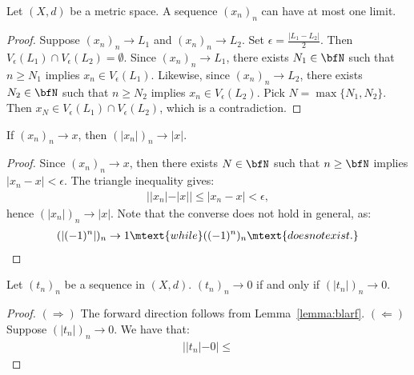     \begin{proposition}
        Let $(X,d)$ be a metric space. A sequence $(x_n)_n$ can have at most one limit.
    \end{proposition}
        \begin{proof}
            Suppose $(x_n)_n \rightarrow L_1$ and $(x_n)_n \rightarrow L_2$. Set $\epsilon = \frac{|L_1 - L_2|}{2}$. Then $V_\epsilon(L_1) \cap V_\epsilon(L_2) = \emptyset$. Since $(x_n)_n \rightarrow L_1$, there exists $N_1 \in \bfN$ such that $n \geq N_1$ implies $x_n \in V_\epsilon(L_1)$. Likewise, since $(x_n)_n \rightarrow L_2$, there exists $N_2 \in \bfN$ such that $n \geq N_2$ implies $x_n \in V_\epsilon(L_2)$. Pick $N = \max\{N_1,N_2\}$. Then $x_N \in V_\epsilon(L_1)\cap V_\epsilon(L_2)$, which is a contradiction. 
        \end{proof}

    \begin{lemma}\label{lemma:blarf}
        If $(x_n)_n \rightarrow x$, then $(|x_n|)_n \rightarrow |x|$.
    \end{lemma}
        \begin{proof}
            Since $(x_n)_n \rightarrow x$, then there exists $N \in \bfN$ such that $n\geq \bfN$ implies $|x_n - x | < \epsilon$. The triangle inequality gives:
                \begin{equation*}
                \begin{split}
                    ||x_n| - |x|| \leq |x_n - x| < \epsilon,
                \end{split}
                \end{equation*}
            hence $(|x_n|)_n \rightarrow |x|$. Note that the converse does not hold in general, as:
                \begin{equation*}
                \begin{split}
                    (|(-1)^n|)_n \rightarrow 1 \mtext{while} ((-1)^n)_n \mtext{does not exist.} \qedhere
                \end{split}
                \end{equation*}
        \end{proof}

    \begin{lemma}
        Let $(t_n)_n$ be a sequence in $(X,d)$. $(t_n)_n \rightarrow 0$ if and only if $(|t_n|)_n \rightarrow 0$.
    \end{lemma}
        {\color{red} \begin{proof}
            $(\Rightarrow)$ The forward direction follows from Lemma~\ref{lemma:blarf}.
            $(\Leftarrow)$ Suppose $(|t_n|)_n \rightarrow 0$. We have that:
                \begin{equation*}
                \begin{split}
                    ||t_n| - 0| \leq 
                \end{split}
                \end{equation*}
        \end{proof}}

